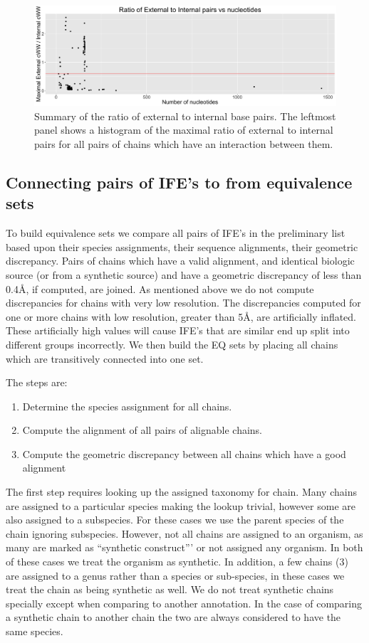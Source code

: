 \begin{figure}
  \includegraphics[width=\linewidth]{chapter-3/figs/internal-external}
  \caption{Summary of the ratio of external to internal base pairs. The leftmost
    panel shows a histogram of the maximal ratio of external to internal pairs
  for all pairs of chains which have an interaction between them. }
  \label{fig:ext-vs-int}
\end{figure}

\subsection{Connecting pairs of IFE's to from equivalence sets}

To build equivalence sets we compare all pairs of IFE's in the preliminary list
based upon their species assignments, their sequence alignments, their geometric
discrepancy. Pairs of chains which have a valid alignment, and identical
biologic source (or from a synthetic source) and have a geometric discrepancy of less than
0.4{\AA}, if computed, are joined. As mentioned above we do not compute
discrepancies for chains with very low resolution. The discrepancies computed
for one or more chains with low resolution, greater than 5{\AA}, are artificially
inflated. These artificially high values will cause IFE's that are similar end
up split into different groups incorrectly. We then build the EQ sets by placing
all chains which are transitively connected into one set. 

The steps are:
\begin{enumerate}
  \item Determine the species assignment for all chains.
  \item Compute the alignment of all pairs of alignable chains.
  \item Compute the geometric discrepancy between all chains which have a good alignment
\end{enumerate}

The first step requires looking up the assigned taxonomy for chain. Many chains
are assigned to a particular species making the lookup trivial, however some are
also assigned to a subspecies. For these cases we use the parent species of the
chain ignoring subspecies. However, not all chains are assigned to an organism,
as many are marked as ``synthetic construct''' or not assigned any organism. In
both of these cases we treat the organism as synthetic. In addition, a few
chains (3) are assigned to a genus rather than a species or sub-species, in
these cases we treat the chain as being synthetic as well. We do not treat
synthetic chains specially except when comparing to another annotation. In the
case of comparing a synthetic chain to another chain the two are always
considered to have the same species.

